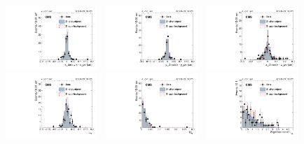 		\begin{figure}[p]
		  \centering
		  \includegraphics[width=0.31\textwidth]{Fig/Final_NoPreliminary/ZJpsiG/VtxDispX_Norm_EE}~
		  \includegraphics[width=0.31\textwidth]{Fig/Final_NoPreliminary/ZJpsiG/VtxDispY_Norm_EE}~
		  \includegraphics[width=0.31\textwidth]{Fig/Final_NoPreliminary/ZJpsiG/VtxDispZ_Norm_EE}\\
		  \includegraphics[width=0.31\textwidth]{Fig/Final_NoPreliminary/ZJpsiG/Lxy_Norm_EE}~
		  \includegraphics[width=0.31\textwidth]{Fig/Final_NoPreliminary/ZJpsiG/Rxy_Norm_EE}~
		  \includegraphics[width=0.31\textwidth]{Fig/Final_NoPreliminary/ZJpsiG/SLxy_Norm_EE}\\

\end{figure}
